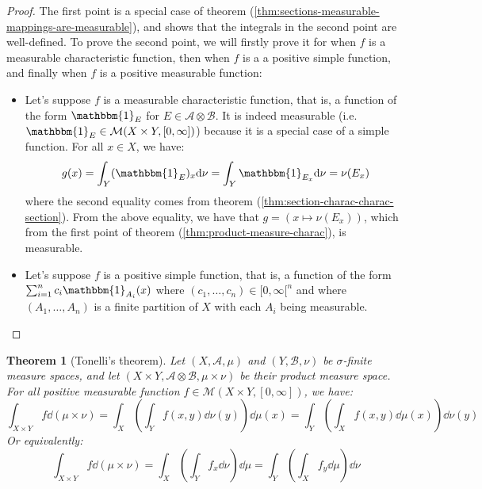 \documentclass{article}
\newtheorem{theorem}{Theorem}[section]
\theoremstyle{definition}
\theoremstyle{remark}
\theoremstyle{example}
\theoremstyle{notation}
\theoremstyle{axiom}
\begin{document}
\begin{proof}
		The first point is a special case of theorem (\ref{thm:sections-measurable-mappings-are-measurable}), and shows that the integrals in the second point are well-defined. To prove the second point, we will firstly prove it for when $f$ is a measurable characteristic function, then when $f$ is a a positive simple function, and finally when $f$ is a positive measurable function:
		\begin{itemize}
				\item Let's suppose $f$ is a measurable characteristic function, that is, a function of the form $\mathbbm{1}_{E}$ for $E \in \mathcal{A} \otimes \mathcal{B}$. It is indeed measurable (i.e. $\mathbbm{1}_E \in \mathcal{M}(X \times Y, [0, \infty])$) because it is a special case of a simple function. For all $x \in X$, we have:
						$$g(x) = \int_Y (\mathbbm{1}_E)_x \dd \nu = \int_Y \mathbbm{1}_{E_x} \dd \nu = \nu(E_x)$$
				where the second equality comes from theorem (\ref{thm:section-charac-charac-section}). From the above equality, we have that $g = (x \mapsto \nu(E_x))$, which from the first point of theorem (\ref{thm:product-measure-charac}), is measurable.
		\item Let's suppose $f$ is a positive simple function, that is, a function of the form $\sum_{i=1}^n c_i \mathbbm{1}_{A_i}(x)$ where $(c_1, \dots, c_n) \in [0, \infty[^n$ and where $(A_1, \dots, A_n)$ is a finite partition of $X$ with each $A_i$ being measurable.
		\end{itemize}
\end{proof}


\begin{theorem}[Tonelli's theorem]
		Let $(X, \mathcal{A}, \mu)$ and $(Y, \mathcal{B}, \nu)$ be $\sigma$-finite measure spaces, and let $(X \times Y, \mathcal{A} \otimes \mathcal{B}, \mu \times \nu)$ be their product measure space. For all positive measurable function $f \in \mathcal{M}(X \times Y, [0, \infty])$, we have:
				$$\int_{X \times Y} f \dd (\mu \times \nu) = \int_X \left(\int_Y f(x, y) \dd \nu(y)\right) \dd \mu(x) = \int_Y \left(\int_X f(x, y) \dd \mu(x)\right) \dd \nu(y)$$
		Or equivalently:
				$$\int_{X \times Y} f \dd (\mu \times \nu) = \int_X \left(\int_Y f_x \dd \nu\right) \dd \mu = \int_Y \left(\int_X f_y \dd \mu\right) \dd \nu$$
\end{theorem} %
\end{document}
